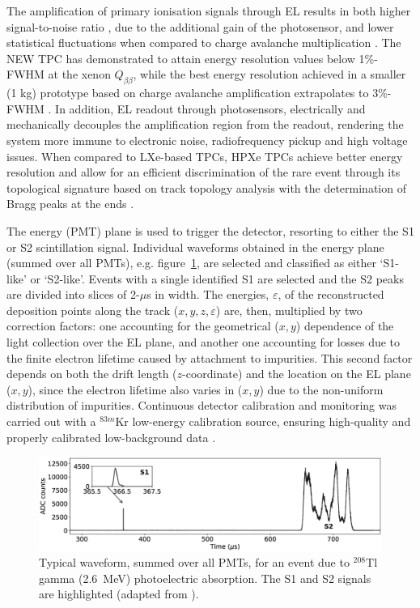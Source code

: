 \documentclass[%
 reprint,
superscriptaddress,
 amsmath,amssymb,
 aps,
]{revtex4-2}
\begin{document}
The amplification of primary ionisation signals through EL results in both higher signal-to-noise ratio \cite{h,i}, due to the additional gain of the photosensor, and lower statistical fluctuations when compared to charge avalanche multiplication \cite{43}. The NEW TPC has demonstrated to attain energy resolution values below 1\%-FWHM \cite{46} at the xenon $Q_{\beta\beta}$, while the best energy resolution achieved in a smaller (1 kg) prototype based on charge avalanche amplification extrapolates to 3\%-FWHM \cite{L}. In addition, EL readout through photosensors, electrically and mechanically decouples the amplification region from the readout, rendering the system more immune to electronic noise, radiofrequency pickup and high voltage issues. When compared to LXe-based TPCs, HPXe TPCs achieve better energy resolution and allow for an efficient discrimination of the rare event through its topological signature based on track topology analysis with the determination of Bragg peaks at the ends \cite{L,m,n,6}. 

The energy (PMT) plane is used to trigger the detector, resorting to either the S1 or S2 scintillation signal. Individual waveforms obtained in the energy plane (summed over all PMTs), e.g. figure~\ref{fig:NEW_waveform}, are selected and classified as either `S1-like' or `S2-like'. Events with a single identified S1 are selected and the S2 peaks are divided into slices of 2-$\mu$s in width. The energies, $\varepsilon$, of the reconstructed deposition points along the track ($x, y, z, \varepsilon$) are, then, multiplied by two correction factors: one accounting for the geometrical ($x, y$) dependence of the light collection over the EL plane, and another one accounting for losses due to the finite electron lifetime caused by attachment to impurities. This second factor depends on both the drift length ($z$-coordinate) and the location on the EL plane ($x, y$), since the electron lifetime also varies in ($x, y$) due to the non-uniform distribution of impurities. Continuous detector calibration and monitoring was carried out with a $^{83m}$Kr low-energy calibration source, ensuring high-quality and properly calibrated low-background data \cite{p}. 


\begin{figure}[t]
\centering %
\includegraphics[width=\textwidth,height=\textheight,keepaspectratio]{Fig3.eps}
\caption{\label{fig:NEW_waveform}Typical waveform, summed over all PMTs, for an event due to $^{208}$Tl gamma (2.6~MeV) photoelectric absorption. The S1 and S2 signals are highlighted (adapted from \cite{46}).}
\end{figure}
\end{document}
